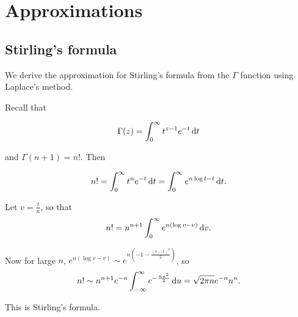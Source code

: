 \documentclass{notes}
\begin{document}
\chapter{Approximations}

\section*{Stirling's formula}

We derive the approximation for Stirling's formula from the $\Gamma$
function using Laplace's method.

Recall that

\[
\Gamma(z) = \int_0^\infty t^{z-1} e^{-t}\, \mathrm{d} t
\]

and $\Gamma(n+1) = n!$.  Then

\[
n! = \int_0^\infty t^n e^{-t}\, \mathrm{d} t = \int_0^\infty
e^{n \log t - t}\, \mathrm{d} t.
\]

Let $v = \tfrac{t}{n}$, so that
\[
n! = n^{n+1} \int_0^\infty e^{n (\log v - v)}\, \mathrm{d} v. 
\]

Now for large $n$, $e^{n (\log v - v)} \sim e^{n
\left(-1 - \frac{(v-1)^2}{2}\right)}$, so
\[
n! \sim n^{n+1} e^{-n} \int_{-\infty}^\infty e^{-\frac{n u^2}{2}}\,
\mathrm{d} u = \sqrt{2 \pi n} e^{-n} n^n.
\]

This is Stirling's formula.
\end{document}
